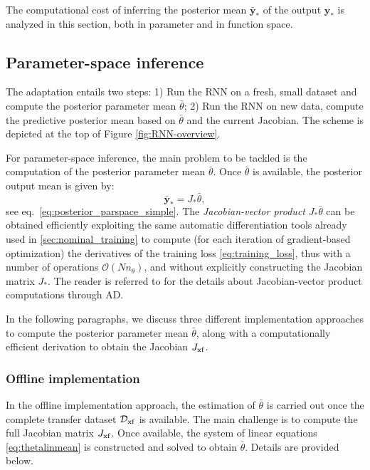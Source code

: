 \documentclass{article}
\newcommand{\nsamp}{{N}}
\newcommand{\npar}{{n_\theta}}
\newcommand{\D}{\mathcal{D}}
\newcommand{\transf}{{\rm{xf}}}
\newcommand{\tvec}[1]{{\mathbf{#1}}}
\begin{document}
The computational cost  of inferring  the posterior mean $\bar{\tvec{y}}_*$ of the output $\tvec{y}_*$ is analyzed in this section, both in parameter and in function space.

\subsection{Parameter-space inference}\label{sec:parspace_inferece}
The adaptation entails two steps: 1) Run the RNN on a fresh, small dataset and compute the posterior parameter mean $\bar{\theta}$; 2) Run the RNN on new data, compute the predictive posterior mean based on $\bar{\theta}$ and the current Jacobian. The scheme is depicted at the top of Figure \ref{fig:RNN-overview}. 


For parameter-space inference, the main problem to be tackled is the computation of the posterior parameter mean $\bar{\theta}$. Once $\bar{\theta}$ is available, the posterior 
output mean    is given by:  $$\bar{\tvec{y}}_* =   J_* \bar{\theta},$$ see eq.~\eqref{eq:posterior_parspace_simple}. 
The \emph{Jacobian-vector product} $ J_* \bar{\theta}$ can be obtained efficiently exploiting the same automatic differentiation tools already used in \ref{sec:nominal_training} to compute (for each iteration of gradient-based optimization) the derivatives of the training loss \eqref{eq:training_loss}, thus with a number of operations $\mathcal{O}(\nsamp \npar)$, and without explicitly constructing the Jacobian matrix $J_*$. 
The reader is referred to \cite{balestriero2021fast, baydin2017automatic} for the details about Jacobian-vector product computations through  AD. 

In the following paragraphs, we discuss three different implementation approaches to compute the posterior parameter mean $\bar{\theta}$, along with a computationally efficient derivation to obtain the Jacobian $J_\transf$. 


\subsubsection{Offline implementation}
In the offline implementation approach, the estimation of $\bar \theta$ is carried out once the complete transfer 
dataset $\D_\transf$ is available.
The main challenge is to compute the full Jacobian matrix $J_\transf$. Once available,    the system of  linear equations \eqref{eq:thetalinmean} is constructed and solved to obtain $\bar{\theta}$. Details are provided below.\\
\end{document}
